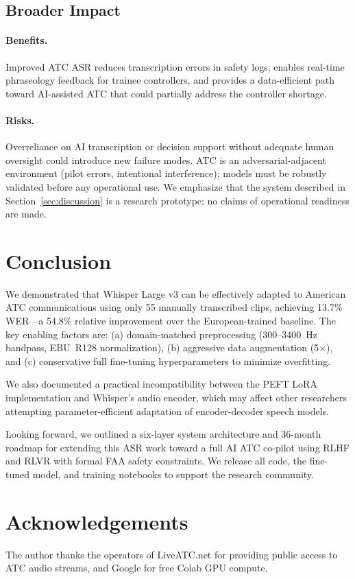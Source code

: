 \documentclass[11pt,a4paper]{article}
\begin{document}
\subsection{Broader Impact}

\paragraph{Benefits.}
Improved ATC ASR reduces transcription errors in safety logs, enables
real-time phraseology feedback for trainee controllers, and provides a
data-efficient path toward AI-assisted ATC that could partially address
the controller shortage.

\paragraph{Risks.}
Overreliance on AI transcription or decision support without adequate human
oversight could introduce new failure modes.
ATC is an adversarial-adjacent environment (pilot errors, intentional
interference); models must be robustly validated before any operational use.
We emphasize that the system described in Section~\ref{sec:discussion} is
a research prototype; no claims of operational readiness are made.

\section{Conclusion}

We demonstrated that Whisper Large v3 can be effectively adapted to American
ATC communications using only 55 manually transcribed clips, achieving 13.7\%
WER---a 54.8\% relative improvement over the European-trained baseline.
The key enabling factors are: (a) domain-matched preprocessing (300--3400~Hz
bandpass, EBU~R128 normalization), (b) aggressive data augmentation (5$\times$),
and (c) conservative full fine-tuning hyperparameters to minimize overfitting.

We also documented a practical incompatibility between the PEFT LoRA
implementation and Whisper's audio encoder, which may affect other researchers
attempting parameter-efficient adaptation of encoder-decoder speech models.

Looking forward, we outlined a six-layer system architecture and 36-month
roadmap for extending this ASR work toward a full AI ATC co-pilot using RLHF
and RLVR with formal FAA safety constraints.
We release all code, the fine-tuned model, and training notebooks to support
the research community.

\section*{Acknowledgements}

The author thanks the operators of LiveATC.net for providing public access
to ATC audio streams, and Google for free Colab GPU compute.



\end{document}
